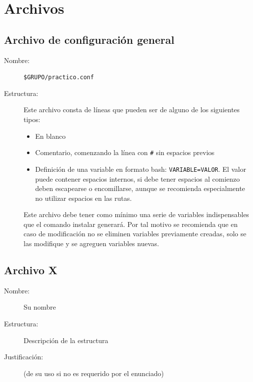 \documentclass[12pt]{article}
\begin{document}
\section{Archivos}
\subsection{Archivo de configuración general}
\begin{description}
	\item [Nombre:] \verb|$GRUPO/practico.conf|
	\item [Estructura:] Este archivo consta de líneas que pueden ser de alguno de los siguientes tipos:
	\begin{itemize}
		\item En blanco
		\item Comentario, comenzando la línea con \verb|#| sin espacios previos
		\item Definición de una variable en formato bash: \verb|VARIABLE=VALOR|. El valor puede contener espacios internos, si debe tener espacios al comienzo deben escapearse o encomillarse, aunque se recomienda especialmente no utilizar espacios en las rutas.
	\end{itemize}
	Este archivo debe tener como mínimo una serie de variables indispensables que el comando instalar generará. Por tal motivo se recomienda que en caso de modificación no se eliminen variables previamente creadas, solo se las modifique y se agreguen variables nuevas.
\end{description}

\subsection{Archivo X}
\begin{description}
	\item [Nombre:] Su nombre
	\item [Estructura:] Descripción de la estructura
	\item [Justificación:] (de su uso si no es requerido por el enunciado)
\end{description}
\end{document}
